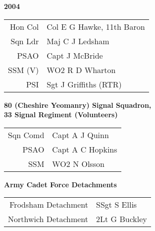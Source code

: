 \begin{center}
  \Huge
  \textbf{2004}
\end{center}

\begin{center}
  \small
  \begin{tabular}{rl}
    Hon Col & Col E G Hawke, 11th Baron \\
    Sqn Ldr & Maj C J Ledsham \\
    PSAO & Capt J McBride \\
    SSM (V) & WO2 R D Wharton \\
    PSI & Sgt J Griffiths (RTR) \\
  \end{tabular}
\end{center}

\begin{center}
  \Large
  \textbf{80 (Cheshire Yeomanry) Signal Squadron, \\ 33 Signal Regiment (Volunteers)}
\end{center}

\begin{center}
  \small
  \begin{tabular}{rl}
    Sqn Comd & Capt A J Quinn \\
    PSAO & Capt A C Hopkins \\
    SSM & WO2 N Olsson \\
  \end{tabular}
\end{center}

\begin{center}
  \Large
  \textbf{Army Cadet Force Detachments}
\end{center}

\begin{center}
  \small
  \begin{tabular}{rl}
    Frodsham Detachment & SSgt S Ellis \\
    Northwich Detachment & 2Lt G Buckley \\
  \end{tabular}
\end{center}

\vspace{50mm}

\pagebreak
